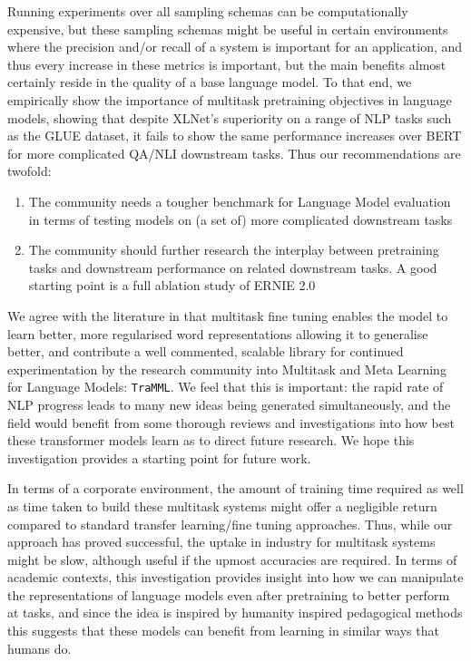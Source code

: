 \documentclass[11pt]{report}
\theoremstyle{Definition}
\theoremstyle{remark}
\begin{document}
Running experiments over all sampling schemas can be computationally expensive, but these sampling schemas might be useful in certain environments where the precision and/or recall of a system is important for an application, and thus every increase in these metrics is important, but the main benefits almost certainly reside in the quality of a base language model. To that end, we empirically show the importance of multitask pretraining objectives in language models, showing that despite XLNet's superiority on a range of NLP tasks such as the GLUE dataset, it fails to show the same performance increases over BERT for more complicated QA/NLI downstream tasks. Thus our recommendations are twofold: 
\begin{enumerate}
	\item The community needs a tougher benchmark for Language Model evaluation in terms of testing models on (a set of) more complicated downstream tasks
	\item The community should further research the interplay between pretraining tasks and downstream performance on related downstream tasks. A good starting point is a full ablation study of ERNIE 2.0 \cite{Sun2019a}
\end{enumerate}

We agree with the literature in that multitask fine tuning enables the model to learn better, more regularised word representations allowing it to generalise better, and contribute a well commented, scalable library for continued experimentation by the research community into Multitask and Meta Learning for Language Models: \texttt{TraMML}. We feel that this is important: the rapid rate of NLP progress leads to many new ideas being generated simultaneously, and the field would benefit from some thorough reviews and investigations into how best these transformer models learn as to direct future research. We hope this investigation provides a starting point for future work.

In terms of a corporate environment, the amount of training time required as well as time taken to build these multitask systems might offer a negligible return compared to standard transfer learning/fine tuning approaches. Thus, while our approach has proved successful, the uptake in industry for multitask systems might be slow, although useful if the upmost accuracies are required. In terms of academic contexts, this investigation provides insight into how we can manipulate the representations of language models even after pretraining to better perform at tasks, and since the idea is inspired by humanity inspired pedagogical methods this suggests that these models can benefit from learning in similar ways that humans do.
\end{document}
